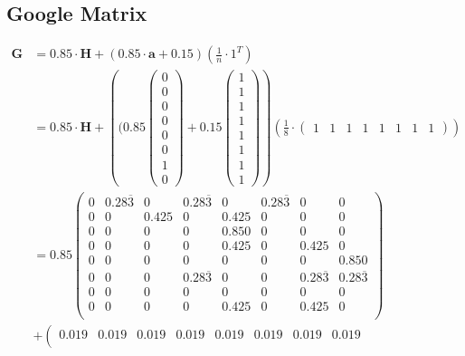 \documentclass[11pt]{report}
\begin{document}
\begin{appendices}
\chapter{Google Matrix}
\begin{align*}
\textbf{G} &  = 0.85\cdot\textbf{H} + (0.85\cdot\textbf{a} + 0.15)\left(\frac{1}{n}\cdot 1^T\right)\\
& = 0.85\cdot\textbf{H} + \left((0.85\left(\begin{array}{c}
0\\0\\0\\0\\0\\0\\1\\0\end{array}\right) + 0.15\left(\begin{array}{c}
1\\1\\1\\1\\1\\1\\1\\1\end{array}\right)\right)\left(\frac{1}{8}\cdot\left(\begin{array}{cccccccc}
1&1&1&1&1&1&1&1\end{array}\right)\right)\\
&= 0.85\left(
\begin{array}{cccccccc}
0 & 0.28\overline{3} & 0 & 0.28\overline{3} & 0 & 0.28\overline{3} & 0 & 0  \\
0 & 0 & 0.425 & 0 & 0.425 & 0 & 0 & 0  \\
0 & 0 & 0 & 0 & 0.850 & 0 & 0 & 0  \\
0 & 0 & 0 & 0 & 0.425 & 0 & 0.425 & 0  \\
0 & 0 & 0 & 0 & 0 & 0 & 0 & 0.850  \\
0 & 0 & 0 & 0.28\overline{3} & 0 & 0 & 0.28\overline{3} & 0.28\overline{3}  \\
0 & 0 & 0 & 0 & 0 & 0 & 0 & 0  \\
0 & 0 & 0 & 0 & 0.425 & 0 & 0.425 & 0  \\
\end{array}
\right) \\&+ \left(
\begin{array}{cccccccc}
0.019 & 0.019 & 0.019 & 0.019 & 0.019 & 0.019 & 0.019 & 0.019  \\

\end{array}
\end{align*}
\end{appendices}
\end{document}
